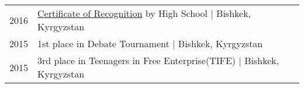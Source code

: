 \documentclass[]{deedy-resume-openfont}
\begin{document}
\begin{minipage}[t]{0.59\textwidth}
\begin{tabular}{rll}
2016& \href{https://drive.google.com/file/d/1o5RlENDFXKvinzGZUYTIfz6aq-q7dEv1/view?usp=sharing}{Certificate of Recognition} by High School \space | Bishkek, Kyrgyzstan\\
2015& 1st place in Debate Tournament \space | Bishkek, Kyrgyzstan\\
2015& 3rd place in Teenagers in Free Enterprise(TIFE) \space | Bishkek, Kyrgyzstan\\

\end{tabular}
\sectionsep



\end{minipage} 
\end{document}
